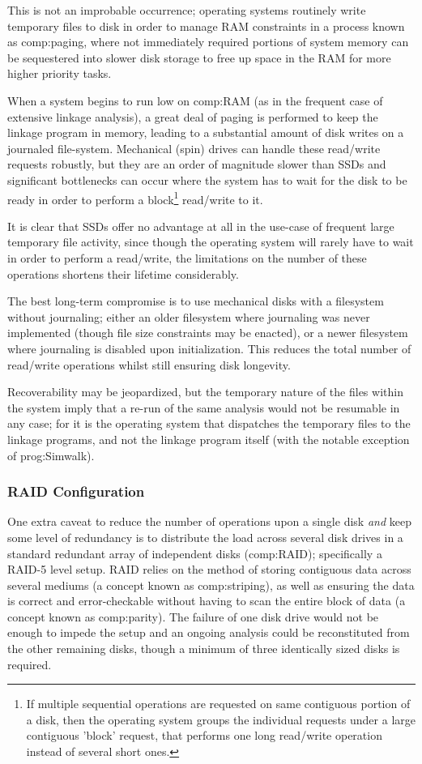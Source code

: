 This is not an improbable occurrence; operating systems routinely write temporary files to disk in order to manage RAM constraints in a process known as \gls{comp:paging}, where not immediately required portions of system memory can be sequestered into slower disk storage to free up space in the RAM for more higher priority tasks. 

When a system begins to run low on \gls{comp:RAM} (as in the frequent case of extensive linkage analysis), a great deal of paging is performed to keep the linkage program in memory, leading to a substantial amount of disk writes on a journaled file-system. Mechanical (spin) drives can handle these read/write requests robustly, but they are an order of magnitude slower than SSDs and significant bottlenecks can occur where the system has to wait for the disk to be ready in order to perform a block\footnote{If multiple sequential operations are requested on same contiguous portion of a disk, then the operating system groups the individual requests under a large contiguous 'block' request, that performs one long read/write operation instead of several short ones.}    read/write to it.

It is clear that SSDs offer no advantage at all in the use-case of frequent large temporary file activity, since though the operating system will rarely have to wait in order to perform a read/write, the limitations on the number of these operations shortens their lifetime considerably.

The best long-term compromise is to use mechanical disks with a filesystem without journaling; either an older filesystem where journaling was never implemented (though file size constraints may be enacted), or a newer filesystem where journaling is disabled upon initialization. This reduces the total number of read/write operations whilst still ensuring disk longevity.

Recoverability may be jeopardized, but the temporary nature of the files within the system imply that a re-run of the same analysis would not be resumable in any case; for it is the operating system that dispatches the temporary files to the linkage programs, and not the linkage program itself (with the  notable exception of \gls{prog:Simwalk}).


\subsubsection{RAID Configuration}

One extra caveat to reduce the number of operations upon a single disk \textit{and} keep some level of redundancy is to distribute the load across several disk drives in a standard redundant array of independent disks (\gls{comp:RAID}); specifically a RAID-5 level setup. RAID relies on the method of storing contiguous data across several mediums (a concept known as \gls{comp:striping}), as well as ensuring the data is correct and error-checkable without having to scan the entire block of data (a concept known as \gls{comp:parity}). The failure of one disk drive would not be enough to impede the setup and an ongoing analysis could be reconstituted from the other remaining disks, though a minimum of three identically sized disks is required.

